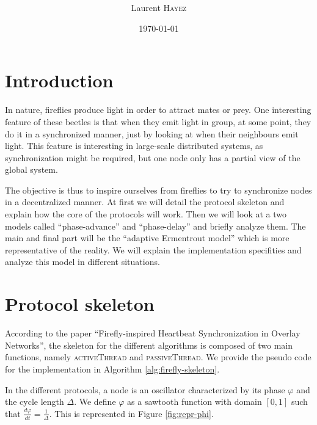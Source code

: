 \documentclass[a4paper, 11pt]{article}
\title{%
  \normalfont{\bfseries{\rule{\linewidth}{2pt} Large-Scale Distributed Systems\\Project 3: Firefly-inspired synchronization\\ %
    \vspace{-0.4cm}  \rule{\linewidth}{2pt}}}
  }
\author{Laurent \textsc{Hayez}}
\date{\today}
\renewcommand{\phi}{\varphi}
\theoremstyle{plain}
\theoremstyle{definition}
\begin{document}
\renewcommand{\proofname}{{\scshape Proof}}
\renewcommand{\labelitemi}{\textbullet}


\maketitle

\renewcommand{\contentsname}{Table of contents}
\tableofcontents



\section{Introduction}
\label{sec:introduction}

  In nature, fireflies produce light in order to attract mates or prey. One interesting feature of these
  beetles is that when they emit light in group, at some point, they do it in a synchronized manner, just by
  looking at when their neighbours emit light. This feature is interesting in large-scale distributed systems,
  as synchronization might be required, but one node only has a partial view of the global system. 

  The objective is thus to inspire ourselves from fireflies to try to synchronize nodes in a decentralized
  manner. At first we will detail the protocol skeleton and explain how the core of the protocols will
  work. Then we will look at a two models called ``phase-advance'' and ``phase-delay'' and briefly analyze
  them. The main and final part will be the ``adaptive Ermentrout model'' which is more representative of
  the reality. We will explain the implementation specifities and analyze this model in different situations.
  
  

\section{Protocol skeleton}
\label{sec:impl-skel}

  According to the paper ``Firefly-inspired Heartbeat Synchronization in Overlay Networks'', the skeleton for
  the different algorithms is composed of two main functions, namely \textsc{activeThread} and
  \textsc{passiveThread}. We provide the pseudo code for the implementation in Algorithm
  \ref{alg:firefly-skeleton}.

  In the different protocols, a node is an oscillator characterized by its phase $\phi$ and the cycle length
  $\Delta$. We define $\phi$ as a sawtooth function with domain $[0,1]$ such that $\frac{d\phi}{dt} =
  \frac{1}{\Delta}$. This is represented in Figure \ref{fig:repr-phi}.
\end{document}
